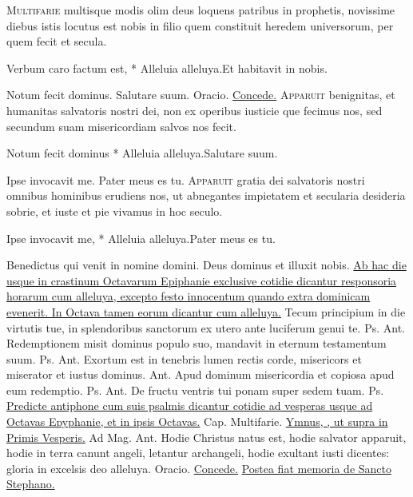 \begin{multicols*}{2}
\lettrine[lines=2]{\zallmancaps \color{Red} M}{ultifarie} multisque modis olim deus loquens patribus in prophetis, novissime diebus istis locutus est nobis in filio quem constituit heredem universorum, per quem fecit et secula.
\begin{responsory-breve}
{Verbum caro factum est, * Alleluia alleluya.}{Et habitavit in nobis.}
\end{responsory-breve}
\V Notum fecit dominus. \R Salutare suum. {\color{Red} Oracio.} \hyperlink{concede-nativitas}{Concede.}
\lettrine[lines=2]{\zallmancaps \color{Blue} A}{pparuit} benignitas, et humanitas salvatoris nostri dei, non ex operibus iusticie que fecimus nos, sed secundum suam misericordiam salvos nos fecit.
\begin{responsory-breve}
{Notum fecit dominus * Alleluia alleluya.}{Salutare suum.}
\end{responsory-breve}
\V Ipse invocavit me. \R Pater meus es tu.
\lettrine[lines=2]{\zallmancaps \color{Red} A}{pparuit} gratia dei salvatoris nostri omnibus hominibus erudiens nos, ut abnegantes impietatem et secularia desideria sobrie, et iuste et pie vivamus in hoc seculo.
\begin{responsory-breve}
{Ipse invocavit me, * Alleluia alleluya.}{Pater meus es tu.}
\end{responsory-breve}
\V Benedictus qui venit in nomine domini. \R Deus dominus et illuxit nobis.
\newline \ul{Ab hac die usque in crastinum Octavarum Epiphanie exclusive cotidie dicantur responsoria horarum cum alleluya, excepto festo innocentum quando extra dominicam evenerit. In Octava tamen eorum dicantur cum alleluya.}
 Tecum principium in die virtutis tue, in splendoribus sanctorum ex utero ante luciferum genui te. {\color{Red} Ps.}  {\color{Red} Ant.} Redemptionem misit dominus populo suo, mandavit in eternum testamentum suum. {\color{Red} Ps.}  {\color{Red} Ant.} Exortum est in tenebris lumen rectis corde, misericors et miserator et iustus dominus.  {\color{Red} Ant.} Apud dominum misericordia et copiosa apud eum redemptio. {\color{Red} Ps.}  {\color{Red} Ant.} De fructu ventris tui ponam super sedem tuam. {\color{Red} Ps.} 
\newline \ul{Predicte antiphone cum suis psalmis dicantur cotidie ad vesperas usque ad Octavas Epyphanie, et in ipsis Octavas.} {\color{Red} Cap.} Multifarie. \ul{Ymnus, \Vbar , ut supra in Primis Vesperis.} {\color{Red} Ad Mag. Ant.} Hodie Christus natus est, hodie salvator apparuit, hodie in terra canunt angeli, letantur archangeli, hodie exultant iusti dicentes: gloria in excelsis deo alleluya. {\color{Red} Oracio.} \hyperlink{concede-nativitas}{Concede.} \ul{Postea fiat memoria de Sancto Stephano.}

\end{multicols*}
